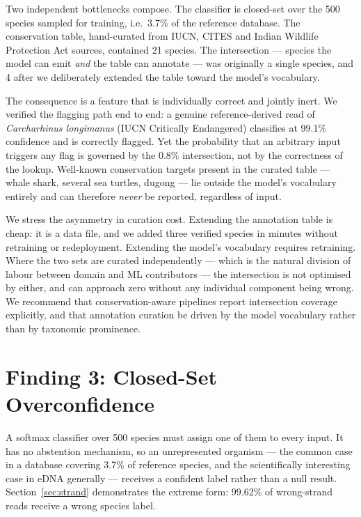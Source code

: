 \documentclass[conference]{IEEEtran}
\begin{document}
Two independent bottlenecks compose. The classifier is closed-set over the
500 species sampled for training, i.e.\ 3.7\% of the reference database. The
conservation table, hand-curated from IUCN, CITES and Indian Wildlife
Protection Act sources, contained 21 species. The intersection --- species
the model can emit \emph{and} the table can annotate --- was originally a
single species, and 4 after we deliberately extended the table toward the
model's vocabulary.

The consequence is a feature that is individually correct and jointly
inert. We verified the flagging path end to end: a genuine reference-derived
read of \textit{Carcharhinus longimanus} (IUCN Critically Endangered)
classifies at 99.1\% confidence and is correctly flagged. Yet the
probability that an arbitrary input triggers any flag is governed by the
0.8\% intersection, not by the correctness of the lookup. Well-known
conservation targets present in the curated table --- whale shark, several
sea turtles, dugong --- lie outside the model's vocabulary entirely and can
therefore \emph{never} be reported, regardless of input.

We stress the asymmetry in curation cost. Extending the annotation table is
cheap: it is a data file, and we added three verified species in minutes
without retraining or redeployment. Extending the model's vocabulary
requires retraining. Where the two sets are curated independently --- which
is the natural division of labour between domain and ML contributors --- the
intersection is not optimised by either, and can approach zero without any
individual component being wrong. We recommend that conservation-aware
pipelines report intersection coverage explicitly, and that annotation
curation be driven by the model vocabulary rather than by taxonomic
prominence.

\section{Finding 3: Closed-Set Overconfidence}
\label{sec:closedset}

A softmax classifier over 500 species must assign one of them to every
input. It has no abstention mechanism, so an unrepresented organism --- the
common case in a database covering 3.7\% of reference species, and the
scientifically interesting case in eDNA generally --- receives a confident
label rather than a null result. Section~\ref{sec:strand} demonstrates the
extreme form: 99.62\% of wrong-strand reads receive a wrong species label.
\end{document}

